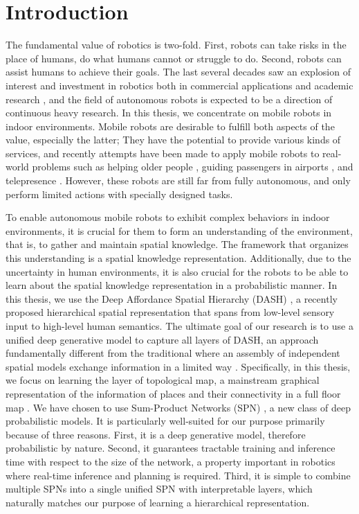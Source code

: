 \documentclass[10pt, titlepage]{article}
\theoremstyle{definition}
\begin{document}
\section{Introduction}
The fundamental value of robotics is two-fold. First, robots can take risks in the place of humans, do what humans cannot or struggle to do. Second, robots can assist humans to achieve their goals. The last several decades saw an explosion of interest and investment in robotics both in commercial applications and academic research \cite{pagliarini2017future}, and the field of autonomous robots is expected to be a direction of continuous heavy research.  In this thesis, we concentrate on mobile robots in indoor environments. Mobile robots are desirable to fulfill both aspects of the value, especially the latter; They have the potential to provide various kinds of services, and recently attempts have been made to apply mobile robots to real-world problems such as helping older people \cite{jayawardena2010deployment}, guiding passengers in airports \cite{triebel2016spencer}, and telepresence \cite{matsuda2016scalablebody}. However, these robots are still far from fully autonomous, and only perform limited actions with specially designed tasks.

To enable autonomous mobile robots to exhibit complex behaviors in indoor environments, it is crucial for them to form an understanding of the environment, that is, to gather and maintain spatial knowledge. The framework that organizes this understanding is a spatial knowledge representation. Additionally, due to the uncertainty in human environments, it is also crucial for the robots to be able to learn about the spatial knowledge representation in a probabilistic manner. In this thesis, we use the Deep Affordance Spatial Hierarchy (DASH) \cite{pronobis2017deep}, a recently proposed hierarchical spatial representation that spans from low-level sensory input to high-level human semantics.  The ultimate goal of our research is to use a unified deep generative model to capture all layers of DASH, an approach fundamentally different from the traditional where an assembly of independent spatial models exchange information in a limited way \cite{pronobis2016learning}. 
Specifically, in this thesis, we focus on learning the layer of topological map, a mainstream graphical representation of the information of places and their connectivity in a full floor map \cite{remolina2004towards}.  We have chosen to use Sum-Product Networks (SPN) \cite{poon2011sum}, a new class of deep probabilistic models. It is particularly well-suited for our purpose primarily because of three reasons. First, it is a deep generative model, therefore probabilistic by nature. Second, it guarantees tractable training and inference time with respect to the size of the network, a property important in robotics where real-time inference and planning is required. Third, it is simple to combine multiple SPNs into a single unified SPN with interpretable layers, which naturally matches our purpose of learning a hierarchical representation.
\end{document}

